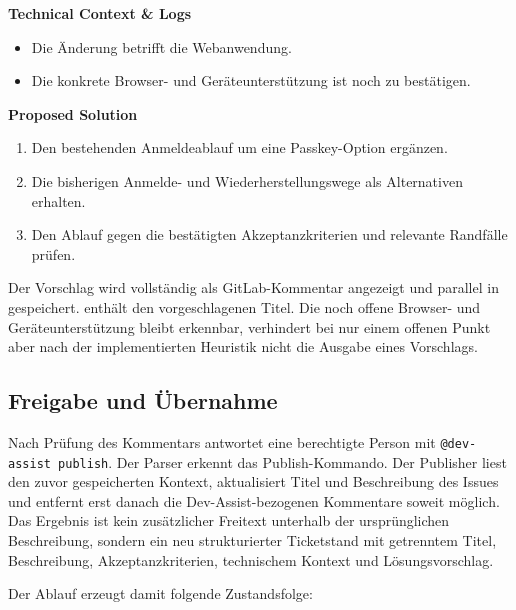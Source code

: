 \textbf{Technical Context \& Logs}

\begin{itemize}[leftmargin=0.8cm]
\item Die Änderung betrifft die Webanwendung.
\item Die konkrete Browser- und Geräteunterstützung ist noch zu bestätigen.
\end{itemize}

\textbf{Proposed Solution}

\begin{enumerate}[leftmargin=1.2cm]
\item Den bestehenden Anmeldeablauf um eine Passkey-Option ergänzen.
\item Die bisherigen Anmelde- und Wiederherstellungswege als Alternativen erhalten.
\item Den Ablauf gegen die bestätigten Akzeptanzkriterien und relevante Randfälle prüfen.
\end{enumerate}

Der Vorschlag wird vollständig als GitLab-Kommentar angezeigt und parallel in  gespeichert.  enthält den vorgeschlagenen Titel. Die noch offene Browser- und Geräteunterstützung bleibt erkennbar, verhindert bei nur einem offenen Punkt aber nach der implementierten Heuristik nicht die Ausgabe eines Vorschlags.

\subsection{Freigabe und Übernahme}

Nach Prüfung des Kommentars antwortet eine berechtigte Person mit \texttt{@dev-assist publish}. Der Parser erkennt das Publish-Kommando. Der Publisher liest den zuvor gespeicherten Kontext, aktualisiert Titel und Beschreibung des Issues und entfernt erst danach die Dev-Assist-bezogenen Kommentare soweit möglich. Das Ergebnis ist kein zusätzlicher Freitext unterhalb der ursprünglichen Beschreibung, sondern ein neu strukturierter Ticketstand mit getrenntem Titel, Beschreibung, Akzeptanzkriterien, technischem Kontext und Lösungsvorschlag.

Der Ablauf erzeugt damit folgende Zustandsfolge:

